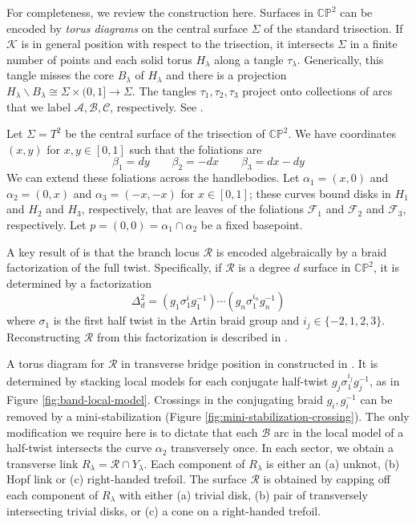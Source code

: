 \documentclass[11pt]{amsart}
\theoremstyle{definition}
\theoremstyle{remark}
\numberwithin{equation}{section}
\newcommand{\cR}{\mathcal{R}}
\newcommand{\cA}{\mathcal{A}}
\newcommand{\cF}{\mathcal{F}}
\newcommand{\cK}{\mathcal{K}}
\newcommand{\cC}{\mathcal{C}}
\newcommand{\cB}{\mathcal{B}}
\newcommand{\CP}{\mathbb{CP}}
\begin{document}
For completeness, we review the construction here.  Surfaces in $\CP^2$ can be encoded by {\it torus diagrams} on the central surface $\Sigma$ of the standard trisection.  If $\cK$ is in general position with respect to the trisection, it intersects $\Sigma$ in a finite number of points and each solid torus $H_{\lambda}$ along a tangle $\tau_{\lambda}$.  Generically, this tangle misses the core $B_{\lambda}$ of $H_{\lambda}$ and there is a projection $H_{\lambda} \smallsetminus B_{\lambda} \cong \Sigma \times (0,1] \rightarrow \Sigma$.  The tangles $\tau_1,\tau_2,\tau_3$ project onto collections of arcs that we label $\cA,\cB,\cC$, respectively.  See \cite[Section 2.2]{LC-Thom}.

Let $\Sigma = T^2$ be the central surface of the trisection of $\CP^2$.  We have coordinates $(x,y)$ for $x,y \in [0,1]$ such that the foliations are 
\[\beta_1 = dy \qquad \beta_2 = -dx \qquad \beta_3 = dx - dy\]
We can extend these foliations across the handlebodies.  Let $\alpha_1 = (x,0)$ and $\alpha_2 = (0,x)$ and $\alpha_3 = (-x,-x)$ for $x \in [0,1]$; these curves bound disks in $H_1$ and $H_2$ and $H_3$, respectively, that are leaves of the foliations $\cF_1$ and $\cF_2$ and $\cF_3$, respectively. Let $p = (0,0) = \alpha_1 \cap \alpha_2$ be a fixed basepoint.

A key result of \cite{AK-branched} is that the branch locus $\cR$ is encoded algebraically by a braid factorization of the full twist.  Specifically, if $\cR$ is a degree $d$ surface in $\CP^2$, it is determined by a factorization
\[\Delta^2_d = (g_1 \sigma^i_1 g^{-1}_1) \cdots (g_n \sigma^{i_n}_1 g^{-1}_n)\]
where $\sigma_1$ is the first half twist in the Artin braid group and $i_j \in \{-2,1,2,3\}$.  Reconstructing $\cR$ from this factorization is described in \cite{AK-branched,LC-symp-surfaces}.  

A torus diagram for $\cR$ in transverse bridge position in constructed in \cite[Proposition 4.6]{LC-symp-surfaces}.  It is determined by stacking local models for each conjugate half-twist $g_j \sigma^{i_j}_1 g^{-1}_j$, as  in Figure \ref{fig:band-local-model}.  Crossings in the conjugating braid $g_i,g^{-1}_i$ can be removed by a mini-stabilization (Figure \ref{fig:mini-stabilization-crossing}).  The only modification we require here is to dictate that each $\cB$ arc in the local model of a half-twist intersects the curve $\alpha_2$ transversely once.  In each sector, we obtain a transverse link $R_{\lambda} = \cR \cap Y_{\lambda}$.  Each component of $R_{\lambda}$ is either an (a) unknot, (b) Hopf link or (c) right-handed trefoil.  The surface $\cR$ is obtained by capping off each component of $R_{\lambda}$ with either (a) trivial disk, (b) pair of transversely intersecting trivial disks, or (c) a cone on a right-handed trefoil.
\end{document}
